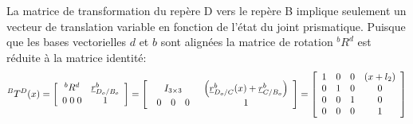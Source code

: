 La matrice de transformation du repère D vers le repère B implique seulement un vecteur de translation variable en fonction de l'état du joint prismatique. Puisque que les bases vectorielles $d$ et $b$ sont alignées la matrice de rotation $^bR^d$ est réduite à la matrice identité:
\begin{align}
^BT^D(x) 
= 
\left[ \begin{array}{c c } 
^bR^d  & \underline{r}_{D_o/B_o}^b \\ 0 \; 0 \; 0 & 1
\end{array} \right] 
= \left[ \begin{array}{c c } 
I_{3\times3} & \left( \underline{r}_{D_o/C}^b(x) + \underline{r}_{C/B_o}^b \right) \\ 
\begin{array}{c c c} 
0 & 0 & 0 
\end{array} & 1
\end{array} \right] 
= 
\left[ \begin{array}{c c c c} 
  1 & 0 & 0 & (x + l_2)  \\
	0 & 1 & 0 & 0  \\
	0 & 0 & 1 & 0  \\ 
	0 & 0 & 0 & 1
\end{array} \right]
\end{align} 

